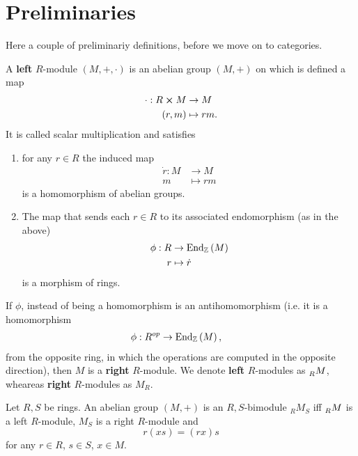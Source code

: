\section{Preliminaries}
Here a couple of preliminariy definitions, before we move on to categories.

\begin{defn}[$R$-module]
	A \textbf{left} $R$-module $\left(M, +, \cdot\right)$ is an abelian group $\left(M, +\right)$ on which is defined a map
	\begin{align}
		\cdot: R \cross M &\to M \\
		\left(r, m\right) &\mapsto rm
	.\end{align} 
	It is called scalar multiplication and satisfies
	\begin{enumerate}
		\item for any $r \in R$ the induced map
			 \begin{align}
				\dot{r}: M &\to M \\
				m &\mapsto rm
			\end{align} 
			is a homomorphism of abelian groups.
		\item The map that sends each $r \in R$ to its associated endomorphism (as in the above)
			\begin{align}
				\phi: R &\to \mathrm{End}_{\mathbb{Z}}\left( M \right) \\
				r &\mapsto \dot{r}
			\end{align} 
			is a morphism of rings.
	\end{enumerate}
	If $\phi$, instead of being a homomorphism is an antihomomorphism (i.e. it is a homomorphism
	\begin{align}
		\phi: R^{op} &\to \mathrm{End}_{ \mathbb{Z}}\left( M \right)
	,\end{align} 
	from the opposite ring, in which the operations are computed in the opposite direction), then $M$ is a \textbf{right} $R$-module.
	We denote \textbf{left} $R$-modules as $\prescript{}{R}{M}$, wheareas \textbf{right} $R$-modules as $M_R$.
\end{defn}

\begin{defn}[Bimodule]
	Let $R,S$ be rings.
	An abelian group $\left(M, +\right)$ is an $R,S$-bimodule ${}_{R}{M}_{S}$ iff 
	$\prescript{}{R}{M}$ is a left $R$-module, $M_S$ is a right $R$-module and
	\begin{equation}
		r(xs) = (rx)s
	\end{equation} 
	for any $r \in R$, $s \in S$, $x \in M$.
\end{defn}

